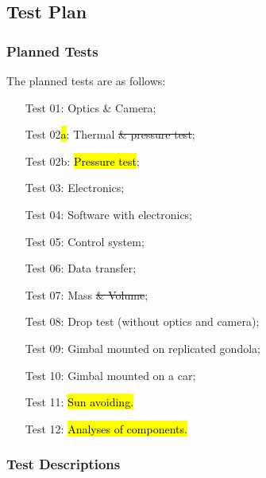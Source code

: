 
\pagebreak
\subsection{Test Plan}

\subsubsection{Planned Tests}
The planned tests are as follows:

\begin{enumerate}[leftmargin=2.1cm]
   \item[Test 01:] Optics \& Camera;
   \item[Test 02\hl{a}:] Thermal \st{\& pressure test};
   \item[Test 02b:] \hl{Pressure test};
   \item[Test 03:] Electronics;
   \item[Test 04:] Software with electronics;
   \item[Test 05:] Control system;
   \item[Test 06:] Data transfer;
   \item[Test 07:] Mass \st{\& Volume};
   \item[Test 08:] Drop test (without optics and camera);
   \item[Test 09:] Gimbal mounted on replicated gondola;
   \item[Test 10:] Gimbal mounted on a car;
   \item[Test 11:] \hl{Sun avoiding.}
   \item[Test 12:] \hl{Analyses of components.}
\end{enumerate}

\subsubsection{Test Descriptions}












